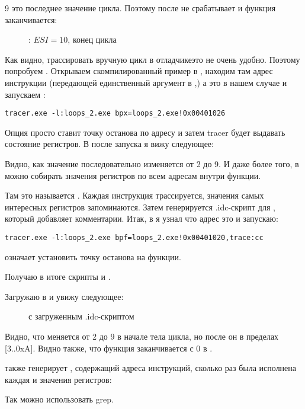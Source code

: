 9 это последнее значение цикла.
Поэтому \JL после  не срабатывает и функция заканчивается:

\begin{figure}[H]
\centering
{}
\caption{\olly: $ESI=10$, конец цикла}
\label{fig:loops_olly_3}
\end{figure}


Как видно, трассировать вручную цикл в отладчике\EMDASH{}это не очень удобно.
Поэтому попробуем \tracer.
Открываем скомпилированный пример в \IDA, находим там адрес инструкции 
(передающей единственный аргумент в \ttf,)
а это  в нашем случае и запускаем \tracer:

\begin{lstlisting}
tracer.exe -l:loops_2.exe bpx=loops_2.exe!0x00401026
\end{lstlisting}

Опция  просто ставит точку останова по адресу и затем tracer будет выдавать состояние регистров.
В  после запуска я вижу следующее:



Видно, как значение \ESI последовательно изменяется от 2 до 9.
И даже более того, в \tracer можно собирать значения регистров по всем адресам внутри функции.

Там это называется .
Каждая инструкция трассируется, значения самых интересных регистров запоминаются.
Затем генерируется .idc-скрипт для \IDA, который добавляет комментарии.
Итак, в \IDA я узнал что адрес \main это  и запускаю:

\begin{lstlisting}
tracer.exe -l:loops_2.exe bpf=loops_2.exe!0x00401020,trace:cc
\end{lstlisting}

 означает установить точку останова на функции.

Получаю в итоге скрипты  и .

\clearpage
Загружаю  в \IDA и увижу следующее:

\begin{figure}[H]
\centering
{}
\caption{\IDA с загруженным .idc-скриптом}
\label{fig:loops_IDA_tracer}
\end{figure}

Видно, что \ESI меняется от 2 до 9 в начале тела цикла, но после 
 он в пределах [3..0xA].
Видно также, что функция \main заканчивается с 0 в \EAX.

\tracer также генерирует , 
содержащий адреса инструкций, сколько раз была исполнена
каждая и значения регистров:


\myindex{\GrepUsage}
Так можно использовать grep.

